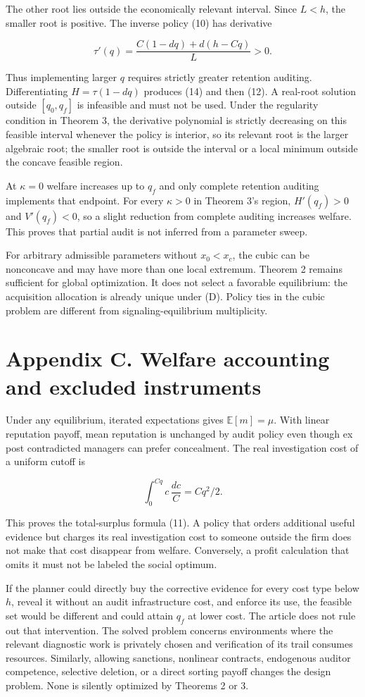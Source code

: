 \documentclass[
  11pt,
]{article}
\begin{document}
The other root lies outside the economically relevant interval. Since
\(L<h\), the smaller root is positive. The inverse policy (10) has
derivative

\[\tau'(q)=\frac{C(1-dq)+d(h-Cq)}{L}>0.\]

Thus implementing larger \(q\) requires strictly greater retention
auditing. Differentiating \(H=\tau(1-dq)\) produces (14) and then (12).
A real-root solution outside \([q_0,q_f]\) is infeasible and must not be
used. Under the regularity condition in Theorem 3, the derivative
polynomial is strictly decreasing on this feasible interval whenever the
policy is interior, so its relevant root is the larger algebraic root;
the smaller root is outside the interval or a local minimum outside the
concave feasible region.

At \(\kappa=0\) welfare increases up to \(q_f\) and only complete
retention auditing implements that endpoint. For every \(\kappa>0\) in
Theorem 3's region, \(H'(q_f)>0\) and \(V'(q_f)<0\), so a slight
reduction from complete auditing increases welfare. This proves that
partial audit is not inferred from a parameter sweep.

For arbitrary admissible parameters without \(x_0<x_c\), the cubic can
be nonconcave and may have more than one local extremum. Theorem 2
remains sufficient for global optimization. It does not select a
favorable equilibrium: the acquisition allocation is already unique
under (D). Policy ties in the cubic problem are different from
signaling-equilibrium multiplicity.

\section{Appendix C. Welfare accounting and excluded
instruments}\label{appendix-c.-welfare-accounting-and-excluded-instruments}

Under any equilibrium, iterated expectations gives \(\mathbb E[m]=\mu\).
With linear reputation payoff, mean reputation is unchanged by audit
policy even though ex post contradicted managers can prefer concealment.
The real investigation cost of a uniform cutoff is

\[\int_0^{Cq}c\,\frac{dc}{C}=Cq^2/2.\]

This proves the total-surplus formula (11). A policy that orders
additional useful evidence but charges its real investigation cost to
someone outside the firm does not make that cost disappear from welfare.
Conversely, a profit calculation that omits it must not be labeled the
social optimum.

If the planner could directly buy the corrective evidence for every cost
type below \(h\), reveal it without an audit infrastructure cost, and
enforce its use, the feasible set would be different and could attain
\(q_f\) at lower cost. The article does not rule out that intervention.
The solved problem concerns environments where the relevant diagnostic
work is privately chosen and verification of its trail consumes
resources. Similarly, allowing sanctions, nonlinear contracts,
endogenous auditor competence, selective deletion, or a direct sorting
payoff changes the design problem. None is silently optimized by
Theorems 2 or 3.
\end{document}
